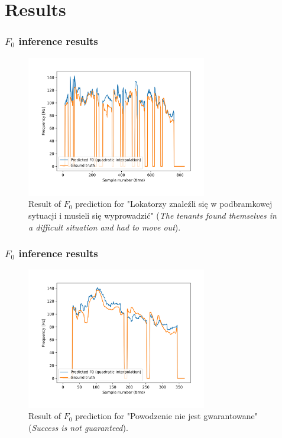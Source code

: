 \documentclass[a4paper,9pt]{beamer}
\theoremstyle{mytheoremstyle}
\begin{document}
\section{Results}

\begin{frame}
\frametitle{$F_{0}$ inference results}
\begin{figure}
\begin{center}
  \includegraphics[width=0.7\textwidth]{res/amu_pl_ilo_BAZA_2006A_zbitki_A0025_simple_pred_freq}
\end{center}
	\caption{Result of $F_0$ prediction for "Lokatorzy znale\'zli si\k{e} w podbramkowej sytuacji i musieli si\k{e} wyprowadzi\'c" (\textit{The tenants found themselves in a difficult situation and had to move out}).}
\end{figure}
\end{frame}

\begin{frame}
\frametitle{$F_{0}$ inference results}
\begin{figure}
\begin{center}
  \includegraphics[width=0.7\textwidth]{res/amu_pl_ilo_BAZA_2006C_C0545_simple_pred_freq}
\end{center}
	\caption{Result of $F_0$ prediction for "Powodzenie nie jest gwarantowane" (\textit{Success is not guaranteed}).}
\end{figure}
\end{frame}
\end{document}
